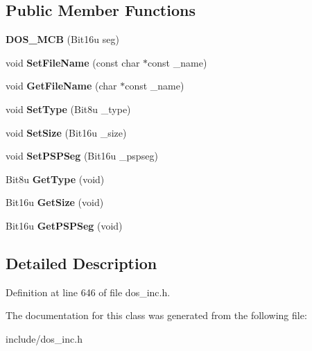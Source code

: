 \subsection*{Public Member Functions}
\begin{DoxyCompactItemize}
\item 
\hypertarget{classDOS__MCB_a0b1bf404720604aafd755212f8d06ffc}{{\bfseries D\-O\-S\-\_\-\-M\-C\-B} (Bit16u seg)}\label{classDOS__MCB_a0b1bf404720604aafd755212f8d06ffc}

\item 
\hypertarget{classDOS__MCB_adb5a8fae4d7777501c48f6fc783da385}{void {\bfseries Set\-File\-Name} (const char $\ast$const \-\_\-name)}\label{classDOS__MCB_adb5a8fae4d7777501c48f6fc783da385}

\item 
\hypertarget{classDOS__MCB_a9b76d148117232e7c4dceb0a7a990d3d}{void {\bfseries Get\-File\-Name} (char $\ast$const \-\_\-name)}\label{classDOS__MCB_a9b76d148117232e7c4dceb0a7a990d3d}

\item 
\hypertarget{classDOS__MCB_ab9545960540afa53f5ead1d49a48890e}{void {\bfseries Set\-Type} (Bit8u \-\_\-type)}\label{classDOS__MCB_ab9545960540afa53f5ead1d49a48890e}

\item 
\hypertarget{classDOS__MCB_a524e972434b1f0b57435a95d6dddd4b5}{void {\bfseries Set\-Size} (Bit16u \-\_\-size)}\label{classDOS__MCB_a524e972434b1f0b57435a95d6dddd4b5}

\item 
\hypertarget{classDOS__MCB_a4a0d73cdef5da789a59a2e141d69b0b6}{void {\bfseries Set\-P\-S\-P\-Seg} (Bit16u \-\_\-pspseg)}\label{classDOS__MCB_a4a0d73cdef5da789a59a2e141d69b0b6}

\item 
\hypertarget{classDOS__MCB_ab5aca8f3fe000215dd7a563a17a990f9}{Bit8u {\bfseries Get\-Type} (void)}\label{classDOS__MCB_ab5aca8f3fe000215dd7a563a17a990f9}

\item 
\hypertarget{classDOS__MCB_a133271b66d178a643a8090c2b3a8784d}{Bit16u {\bfseries Get\-Size} (void)}\label{classDOS__MCB_a133271b66d178a643a8090c2b3a8784d}

\item 
\hypertarget{classDOS__MCB_a3e8986ea9546d0d914202a41bd774288}{Bit16u {\bfseries Get\-P\-S\-P\-Seg} (void)}\label{classDOS__MCB_a3e8986ea9546d0d914202a41bd774288}

\end{DoxyCompactItemize}


\subsection{Detailed Description}


Definition at line 646 of file dos\-\_\-inc.\-h.



The documentation for this class was generated from the following file\-:\begin{DoxyCompactItemize}
\item 
include/dos\-\_\-inc.\-h\end{DoxyCompactItemize}
